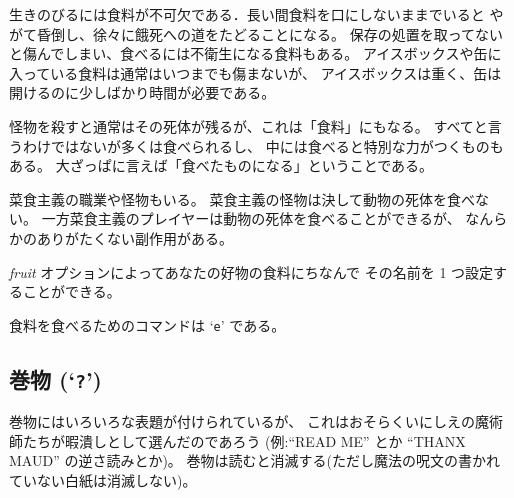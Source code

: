 生きのびるには食料が不可欠である．長い間食料を口にしないままでいると
やがて昏倒し、徐々に餓死への道をたどることになる。
保存の処置を取ってないと傷んでしまい、食べるには不衛生になる食料もある。
アイスボックスや缶に入っている食料は通常はいつまでも傷まないが、
アイスボックスは重く、缶は開けるのに少しばかり時間が必要である。

怪物を殺すと通常はその死体が残るが、これは「食料」にもなる。
すべてと言うわけではないが多くは食べられるし、
中には食べると特別な力がつくものもある。
大ざっぱに言えば「食べたものになる」ということである。

菜食主義の職業や怪物もいる。
菜食主義の怪物は決して動物の死体を食べない。
一方菜食主義のプレイヤーは動物の死体を食べることができるが、
なんらかのありがたくない副作用がある。

{\it fruit\/} オプションによってあなたの好物の食料にちなんで
その名前を 1 つ設定することができる。

食料を食べるためのコマンドは `{\tt e}' である。

\subsection*{巻物 (`{\tt ?}')}

巻物にはいろいろな表題が付けられているが、
これはおそらくいにしえの魔術師たちが暇潰しとして選んだのであろう
(例:``READ ME'' とか ``THANX MAUD'' の逆さ読みとか)。
巻物は読むと消滅する(ただし魔法の呪文の書かれていない白紙は消滅しない)。

